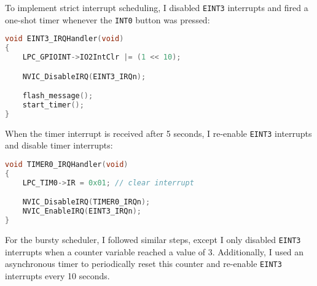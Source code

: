 \documentclass[11pt]{article}
\begin{document}
To implement strict interrupt scheduling, I disabled \texttt{EINT3} interrupts
and fired a one-shot timer whenever the \texttt{INT0} button was pressed:

\begin{lstlisting}[language=c, frame=single]
void EINT3_IRQHandler(void)
{
    LPC_GPIOINT->IO2IntClr |= (1 << 10);

    NVIC_DisableIRQ(EINT3_IRQn);

    flash_message();
    start_timer();
}
\end{lstlisting}
\vspace{0.6em}

When the timer interrupt is received after 5 seconds, I re-enable
\texttt{EINT3} interrupts and disable timer interrupts:

\begin{lstlisting}[language=c, frame=single]
void TIMER0_IRQHandler(void)
{
    LPC_TIM0->IR = 0x01; // clear interrupt

    NVIC_DisableIRQ(TIMER0_IRQn);
    NVIC_EnableIRQ(EINT3_IRQn);
} 
\end{lstlisting}
\vspace{0.6em}

For the bursty scheduler, I followed similar steps, except I only disabled
\texttt{EINT3} interrupts when a counter variable reached a value of 3.
Additionally, I used an asynchronous timer to periodically reset this counter
and re-enable \texttt{EINT3} interrupts every 10 seconds.
\end{document}
